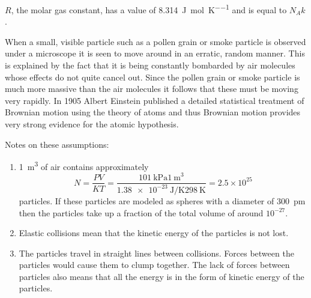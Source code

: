 \documentclass[revision-guide.tex]{subfiles}
\begin{document}
$R$, the molar gas constant, has a value of \SI{8.314}{\joule\per\mole\per\kelvin} and is equal to $N_A k$.


When a small, visible particle such as a pollen grain or smoke particle is observed under a microscope it is seen to move around in an erratic, random manner. This is explained by the fact that it is being constantly bombarded by air molecules whose effects do not quite cancel out. Since the pollen grain or smoke particle is much more massive than the air molecules it follows that these must be moving very rapidly. In 1905 Albert Einstein published a detailed statistical treatment of Brownian motion using the theory of atoms and thus Brownian motion provides very strong evidence for the atomic hypothesis.


Notes on these assumptions:
\begin{enumerate}
  \item \SI{1}{\metre^3} of air contains approximately $$N = \frac{PV}{KT} = \frac{\SI{101}{\kilo\pascal}\SI{1}{\metre^3}}{\SI{1.38e-23}{\joule\per\kelvin}\SI{298}{\kelvin}} = 2.5\times 10^{25}$$
  particles. If these particles are modeled as spheres with a diameter of \SI{300}{\pico\metre} then the particles take up a fraction of the total volume of around $10^{-27}$.
  \item Elastic collisions mean that the kinetic energy of the particles is not lost.
  \item The particles travel in straight lines between collisions. Forces between the particles would cause them to clump together. The lack of forces between particles also means that all the energy is in the form of kinetic energy of the particles.
\end{enumerate}

\end{document}
